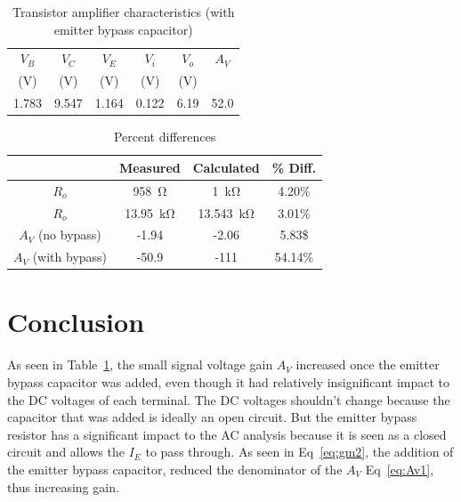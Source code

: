 \begin{table}[hbtp]
  \centering
  \begin{tabular}{ccc|cc|c}
    $V_B$    & $V_C$    & $V_E$    & $V_i$    & $V_o$    & $A_V$ \\
    (\si{V}) & (\si{V}) & (\si{V}) & (\si{V}) & (\si{V}) &       \\
    \hline
    1.783    & 9.547    & 1.164    & 0.122    & 6.19     & 52.0
  \end{tabular}
  \caption{\label{tab:amp_bypass} Transistor amplifier characteristics (with emitter bypass capacitor)}
\end{table}

\begin{table}[hbtp]
  \centering
  \begin{tabular}{c|ccc}
    & Measured & Calculated & \% Diff. \\
    \hline
    $R_o$ & \SI{958}{\ohm} & \SI{1}{\kilo\ohm} & 4.20\% \\
    $R_o$ & \SI{13.95}{\kilo\ohm} & \SI{13.543}{\kilo\ohm} & 3.01\% \\
    $A_V$ (no bypass) & -1.94 & -2.06 & 5.83\$ \\
    $A_V$ (with bypass) & -50.9 & -111 & 54.14\% \\
  \end{tabular}
  \caption{\label{tab:gains} Percent differences}
\end{table}

\newpage

\section{Conclusion}
\label{sec:conclusion}

As seen in Table~\ref{tab:amp_bypass}, the small signal voltage gain $A_V$ increased once the emitter bypass capacitor was added, even though it had relatively insignificant impact to the DC voltages of each terminal. The DC voltages shouldn’t change because the capacitor that was added is ideally an open circuit. But the emitter bypass resistor has a significant impact to the AC analysis because it is seen as a closed circuit and allows the $I_E$ to pass through. As seen in Eq~\ref{eq:gm2}, the addition of the emitter bypass capacitor, reduced the denominator of the $A_V$ Eq~\ref{eq:Av1}, thus increasing gain.

